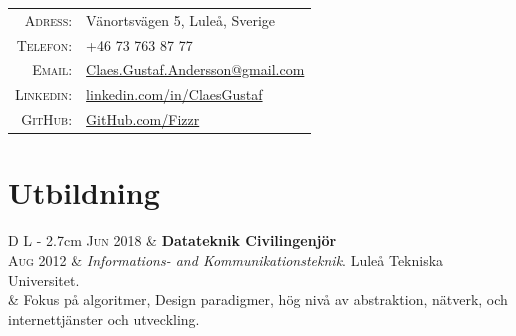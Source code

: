 \documentclass[a4paper,10pt]{article}
\begin{document}
\begin{tabular}{Dl}
    \textsc{Adress:}	&	 Vänortsvägen 5, Luleå, Sverige \\
    \textsc{Telefon:}		&	 +46 73 763 87 77\\
    \textsc{Email:}		&	 \href{mailto:Claes.Gustaf.Andersson@gmail.com}{Claes.Gustaf.Andersson@gmail.com}\\
    \textsc{Linkedin:}	&	 \href{https://linkedin.com/in/ClaesGustaf}{linkedin.com/in/ClaesGustaf} \\
    \textsc{GitHub:}		&	 \href{https://github.com/Fizzr}{GitHub.com/Fizzr}
\end{tabular}


\section{Utbildning}
\begin{tabular}{D L {\textwidth - 2.7cm}}
\textsc{Jun 2018}	&	\textbf{Datateknik Civilingenjör}\\
\textsc{Aug 2012}	&	 \emph{Informations- and Kommunikationsteknik}. Luleå Tekniska Universitet.\\
			&	{\small Fokus på algoritmer, Design paradigmer, hög nivå av abstraktion, nätverk, och internettjänster och utveckling.}
\end{tabular}


\end{document}
